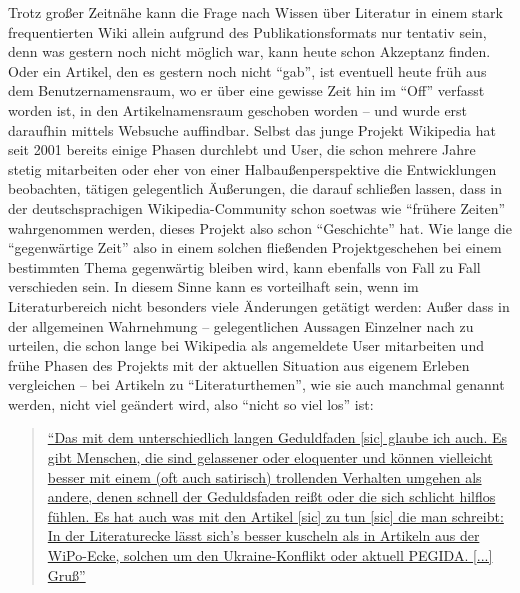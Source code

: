\documentclass[fontsize=12pt]{scrartcl}
\begin{document}
Trotz gro{\ss}er Zeitn\"ahe kann die Frage nach Wissen \"uber Li\-te\-ra\-tur in einem stark frequentierten Wiki allein aufgrund des Publikationsformats nur tentativ sein, denn was gestern noch nicht m\"oglich war, kann heute schon Akzeptanz finden. Oder ein Artikel, den es gestern noch nicht "`gab"', ist eventuell heute fr\"uh aus dem Be\-nut\-zernamensraum, wo er \"uber eine gewisse Zeit hin im "`Off"' verfasst worden ist, in den Artikelnamensraum geschoben worden -- und wurde erst daraufhin mittels Websuche auffindbar. \mbox{Selbst} das junge Projekt Wi\-ki\-pe\-dia hat seit 2001 be\-reits einige Phasen durchlebt und User, die schon meh\-rere Jahre stetig mitarbei\-ten oder eher von einer Halbau{\ss}enperspektive die Entwicklungen beobachten, t\"atigen gelegentlich \"Au{\ss}erungen, die darauf schlie{\ss}en lassen, dass in der deutschspra\-chi\-gen Wi\-ki\-pe\-dia-Community schon soetwas wie "`fr\"uhere Zei\-ten"' wahrgenommen werden, dieses Projekt also schon "`Geschichte"' hat. Wie lange die "`gegenw\"artige Zeit"' also in einem solchen flie{\ss}enden Projektgeschehen bei einem be\-stimmten Thema gegenw\"artig bleiben wird, kann ebenfalls von Fall zu Fall verschieden sein. In diesem Sinne kann es vorteilhaft sein, wenn im Li\-te\-ra\-tur\-bereich nicht besonders viele \"Anderungen get\"atigt werden: Au{\ss}er dass in der allgemeinen Wahrnehmung -- gelegentlichen Aussagen Einzelner nach zu urteilen, die schon lange bei Wi\-ki\-pe\-dia als angemeldete \mbox{User} mitarbei\-ten und fr\"uhe Phasen des Projekts mit der aktuellen Situation aus eigenem Erleben vergleichen -- bei Artikeln zu "`Li\-te\-ra\-tur\-themen"', wie sie auch manchmal genannt werden, nicht viel ge\"andert wird, also "`nicht so viel los"' ist: 

\singlespacing
\begin{quote}
\href{https://de.wikipedia.org/w/index.php?title=Benutzer_Diskussion:Grillenwaage&diff=prev&oldid=137132932}{"`Das mit dem unterschiedlich langen Geduldfaden [sic] glaube ich auch. Es gibt Menschen, die sind gelassener oder eloquenter und k\"onnen vielleicht besser mit einem (oft auch satirisch) trollenden Verhalten umgehen als andere, denen schnell der Geduldsfaden rei{\ss}t oder die sich schlicht hilflos f\"uhlen. Es hat auch was mit den Artikel [sic] zu tun [sic] die man schreibt: In der Li\-te\-ra\-tur\-ecke l\"asst sich's besser kuscheln als in Artikeln aus der WiPo-Ecke, solchen um den Ukraine-Konflikt oder aktuell PEGIDA. [...] Gru{\ss}"'} \cite{UserMagiers2014c}
\end{quote}
\onehalfspacing
\end{document}
